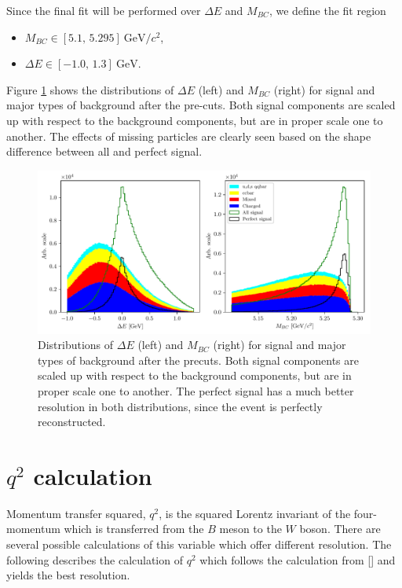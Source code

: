 \documentclass[oneside,a4paper,openany,12pt]{scrbook}
\newcommand {\e}[1]{\mathrm{~#1}}
\begin{document}
Since the final fit will be performed over $\Delta E$ and $M_{BC}$, we define the fit region
\begin{itemize}
\item $M_{BC} \in [5.1,\,5.295]\e{GeV}/c^2$,
\item $\Delta E \in [-1.0,\,1.3]\e{GeV}$.
\end{itemize}

Figure \ref{fig:mbc_de_pre} shows the distributions of $\Delta E$ (left) and $M_{BC}$ (right) for signal and major types of background after the pre-cuts. Both signal components are scaled up with respect to the background components, but are in proper scale one to another. The effects of missing particles are clearly seen based on the shape difference between all and perfect signal.

\begin{figure}[H]
\centering
\captionsetup{width=0.8\linewidth}
\includegraphics[width=\linewidth]{fig/mbc_de_pre}
\caption{Distributions of $\Delta E$ (left) and $M_{BC}$ (right) for signal and major types of background after the precuts. Both signal components are scaled up with respect to the background components, but are in proper scale one to another. The perfect signal has a much better resolution in both distributions, since the event is perfectly reconstructed.}
\label{fig:mbc_de_pre}
\end{figure}


\section{$q^2$ calculation}

Momentum transfer squared, $q^2$, is the squared Lorentz invariant of the four-momentum which is transferred from the $B$ meson to the $W$ boson. There are several possible calculations of this variable which offer different resolution. The following describes the calculation of $q^2$ which follows the calculation from [] and yields the best resolution.
\end{document}
